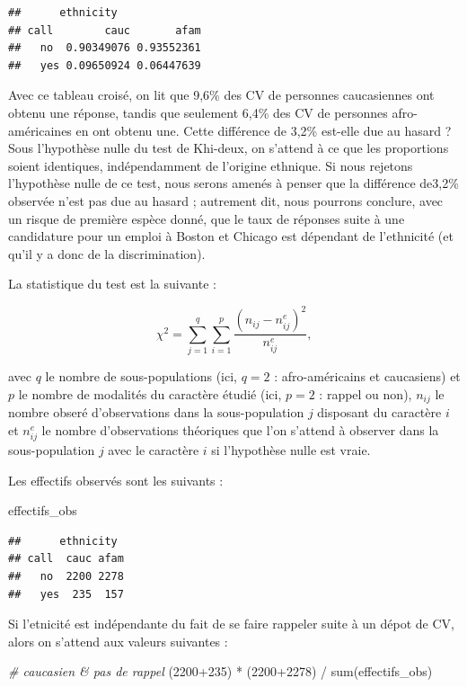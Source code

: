 \documentclass[
  11pt,
]{book}
\newenvironment{Shaded}{\begin{snugshade}}{\end{snugshade}}
\newcommand{\CommentTok}[1]{\textcolor[rgb]{0.56,0.35,0.01}{\textit{#1}}}
\newcommand{\DecValTok}[1]{\textcolor[rgb]{0.00,0.00,0.81}{#1}}
\newcommand{\FunctionTok}[1]{\textcolor[rgb]{0.00,0.00,0.00}{#1}}
\newcommand{\NormalTok}[1]{#1}
\newcommand{\SpecialCharTok}[1]{\textcolor[rgb]{0.00,0.00,0.00}{#1}}
\numberwithin{equation}{section}
\numberwithin{countremarque}{section}
\begin{document}
\begin{lstlisting}
##      ethnicity
## call        cauc       afam
##   no  0.90349076 0.93552361
##   yes 0.09650924 0.06447639
\end{lstlisting}

Avec ce tableau croisé, on lit que 9,6\% des CV de personnes caucasiennes ont obtenu une réponse, tandis que seulement 6,4\% des CV de personnes afro-américaines en ont obtenu une. Cette différence de 3,2\% est-elle due au hasard ? Sous l'hypothèse nulle du test de Khi-deux, on s'attend à ce que les proportions soient identiques, indépendamment de l'origine ethnique. Si nous rejetons l'hypothèse nulle de ce test, nous serons amenés à penser que la différence de3,2\% observée n'est pas due au hasard ; autrement dit, nous pourrons conclure, avec un risque de première espèce donné, que le taux de réponses suite à une candidature pour un emploi à Boston et Chicago est dépendant de l'ethnicité (et qu'il y a donc de la discrimination).

La statistique du test est la suivante :

\[\chi^2 = \sum_{j=1}^{q} \sum_{i=1}^{p} \frac{(n_{ij} - n_{ij}^e)^2}{n_{ij}^e},\]

avec \(q\) le nombre de sous-populations (ici, \(q=2\) : afro-américains et caucasiens) et \(p\) le nombre de modalités du caractère étudié (ici, \(p=2\) : rappel ou non), \(n_{ij}\) le nombre obseré d'observations dans la sous-population \(j\) disposant du caractère \(i\) et \(n_{ij}^e\) le nombre d'observations théoriques que l'on s'attend à observer dans la sous-population \(j\) avec le caractère \(i\) si l'hypothèse nulle est vraie.

Les effectifs observés sont les suivants :

\begin{Shaded}
\begin{Highlighting}[]
\NormalTok{effectifs\_obs}
\end{Highlighting}
\end{Shaded}

\begin{lstlisting}
##      ethnicity
## call  cauc afam
##   no  2200 2278
##   yes  235  157
\end{lstlisting}

Si l'etnicité est indépendante du fait de se faire rappeler suite à un dépot de CV, alors on s'attend aux valeurs suivantes :

\begin{Shaded}
\begin{Highlighting}[]
\CommentTok{\# caucasien \& pas de rappel}
\NormalTok{(}\DecValTok{2200}\SpecialCharTok{+}\DecValTok{235}\NormalTok{) }\SpecialCharTok{*}\NormalTok{ (}\DecValTok{2200}\SpecialCharTok{+}\DecValTok{2278}\NormalTok{) }\SpecialCharTok{/} \FunctionTok{sum}\NormalTok{(effectifs\_obs)}
\end{Highlighting}
\end{Shaded}
\end{document}
